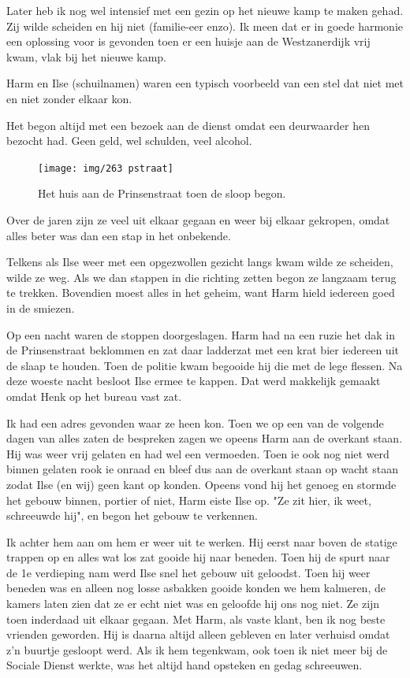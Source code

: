 \documentclass[10pt,twoside, openright]{memoir}
\begin{document}
Later heb ik nog wel intensief met een gezin op het nieuwe kamp te maken gehad. Zij wilde scheiden en hij niet (familie-eer enzo). Ik meen dat er in goede harmonie een oplossing voor is gevonden toen er een huisje aan de Westzanerdijk vrij kwam, vlak bij het nieuwe kamp. 

Harm en Ilse (schuilnamen) waren een typisch voorbeeld van een stel dat niet met en niet zonder elkaar kon. 

Het begon altijd met een bezoek aan de dienst omdat een deurwaarder hen bezocht had. Geen geld, wel schulden, veel alcohol.

\begin{figure}
\texttt{[image: img/263 pstraat]}
\caption*{\footnotesize Het huis aan de Prinsenstraat toen de sloop begon.}
\end{figure}

Over de jaren zijn ze veel uit elkaar gegaan en weer bij elkaar gekropen, omdat alles beter was dan een stap in het onbekende. 

Telkens als Ilse weer met een opgezwollen gezicht langs kwam wilde ze scheiden, wilde ze weg. Als we dan stappen in die richting zetten begon ze langzaam terug te trekken. Bovendien moest alles in het geheim, want Harm hield iedereen goed in de smiezen. 

Op een nacht waren de stoppen doorgeslagen. Harm had na een ruzie het dak in de Prinsenstraat beklommen en zat daar ladderzat met een krat bier iedereen uit de slaap te houden. Toen de politie kwam begooide hij die met de lege flessen. Na deze woeste nacht besloot Ilse ermee te kappen. Dat werd makkelijk gemaakt omdat Henk op het bureau vast zat. 

Ik had een adres gevonden waar ze heen kon. Toen we op een van de volgende dagen van alles zaten de bespreken zagen we opeens Harm aan de overkant staan. Hij was weer vrij gelaten en had wel een vermoeden. Toen ie ook nog niet werd binnen gelaten rook ie onraad en bleef dus aan de overkant staan op wacht staan zodat Ilse (en wij) geen kant op konden. Opeens vond hij het genoeg en stormde het gebouw binnen, portier of niet, Harm eiste Ilse op. "Ze zit hier, ik weet, schreeuwde hij", en begon het gebouw te verkennen. 

Ik achter hem aan om hem er weer uit te werken. Hij eerst naar boven de statige trappen op en alles wat los zat gooide hij naar beneden. Toen hij de spurt naar de 1e verdieping nam werd Ilse snel het gebouw uit geloodst. Toen hij weer beneden was en alleen nog losse asbakken gooide konden we hem kalmeren, de kamers laten zien dat ze er echt niet was en geloofde hij ons nog niet. Ze zijn toen inderdaad uit elkaar gegaan. Met Harm, als vaste klant, ben ik nog beste vrienden geworden. Hij is daarna altijd alleen gebleven en later verhuisd omdat z’n buurtje gesloopt werd. Als ik hem tegenkwam, ook toen ik niet meer bij de Sociale Dienst werkte, was het altijd hand opsteken en gedag schreeuwen.
\end{document}
